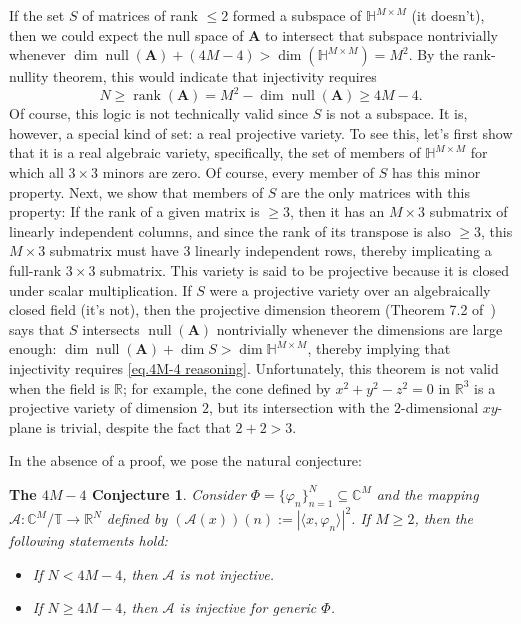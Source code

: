 \documentclass[times,10pt]{elsarticle}
\theoremstyle{plain}
\newtheorem*{conjecture4M4}{\boldmath The $4M-4$ Conjecture}
\begin{document}
If the set $S$ of matrices of rank $\leq 2$ formed a subspace of $\mathbb{H}^{M\times M}$ (it doesn't), then we could expect the null space of $\mathbf{A}$ to intersect that subspace nontrivially whenever $\dim\operatorname{null}(\mathbf{A})+(4M-4)>\dim(\mathbb{H}^{M\times M})=M^2$.
By the rank-nullity theorem, this would indicate that injectivity requires 
\begin{equation}
\label{eq.4M-4 reasoning}
N
\geq\operatorname{rank}(\mathbf{A})
=M^2-\dim\operatorname{null}(\mathbf{A})
\geq 4M-4.
\end{equation}
Of course, this logic is not technically valid since $S$ is not a subspace.
It is, however, a special kind of set: a real projective variety.
To see this, let's first show that it is a real algebraic variety, specifically, the set of members of $\mathbb{H}^{M\times M}$ for which all $3\times 3$ minors are zero.
Of course, every member of $S$ has this minor property.
Next, we show that members of $S$ are the only matrices with this property: 
If the rank of a given matrix is $\geq3$, then it has an $M\times 3$ submatrix of linearly independent columns, and since the rank of its transpose is also $\geq3$, this $M\times 3$ submatrix must have $3$ linearly independent rows, thereby implicating a full-rank $3\times 3$ submatrix.
This variety is said to be projective because it is closed under scalar multiplication. 
If $S$ were a projective variety over an algebraically closed field (it's not), then the projective dimension theorem (Theorem 7.2 of~\cite{Hartshorne:77}) says that $S$ intersects $\operatorname{null}(\mathbf{A})$ nontrivially whenever the dimensions are large enough: $\dim\operatorname{null}(\mathbf{A})+\dim S>\dim\mathbb{H}^{M\times M}$, thereby implying that injectivity requires \eqref{eq.4M-4 reasoning}.
Unfortunately, this theorem is not valid when the field is $\mathbb{R}$;
for example, the cone defined by $x^2+y^2-z^2=0$ in $\mathbb{R}^3$ is a projective variety of dimension $2$, but its intersection with the $2$-dimensional $xy$-plane is trivial, despite the fact that $2+2>3$.

In the absence of a proof, we pose the natural conjecture:

\begin{conjecture4M4}%
Consider $\Phi=\{\varphi_n\}_{n=1}^N\subseteq\mathbb{C}^M$ and the mapping $\mathcal{A}\colon\mathbb{C}^M/\mathbb{T}\rightarrow\mathbb{R}^N$ defined by $(\mathcal{A}(x))(n):=|\langle x,\varphi_n\rangle|^2$.
If $M\geq2$, then the following statements hold:
\begin{itemize}
\item[(a)] If $N<4M-4$, then $\mathcal{A}$ is not injective.
\item[(b)] If $N\geq4M-4$, then $\mathcal{A}$ is injective for generic $\Phi$.
\end{itemize}
\end{conjecture4M4}
\end{document}
